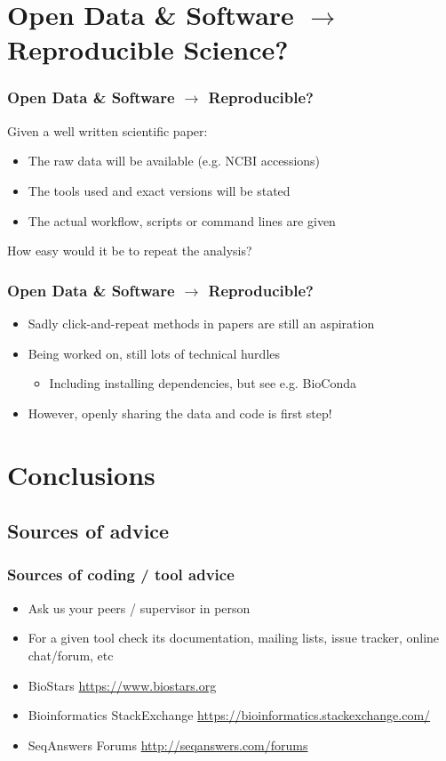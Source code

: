 \section{Open Data \& Software $\rightarrow$ Reproducible Science?}

\begin{frame}
  \frametitle{Open Data \& Software $\rightarrow$ Reproducible?}
  Given a well written scientific paper:
  \begin{itemize}
    \item The raw data will be available (e.g. NCBI accessions)
    \item The tools used and exact versions will be stated
    \item The actual workflow, scripts or command lines are given
  \end{itemize}
  How easy would it be to repeat the analysis?
\end{frame}


\begin{frame}
  \frametitle{Open Data \& Software $\rightarrow$ Reproducible?}
  \begin{itemize}
    \item Sadly click-and-repeat methods in papers are still an aspiration
    \item Being worked on, still lots of technical hurdles
      \begin{itemize}
        \item Including installing dependencies, but see e.g. BioConda
      \end{itemize}
    \item However, openly sharing the data and code is first step!
  \end{itemize}
\end{frame}

\section{Conclusions}

\subsection{Sources of advice}

\begin{frame}
  \frametitle{Sources of coding / tool advice}
  \begin{itemize}
    \item Ask us your peers / supervisor in person
    \item For a given tool check its documentation, mailing lists, issue tracker, online chat/forum, etc
    \item BioStars \url{https://www.biostars.org}
    \item Bioinformatics StackExchange \url{https://bioinformatics.stackexchange.com/}
    \item SeqAnswers Forums \url{http://seqanswers.com/forums}
 \end{itemize}
\end{frame}

